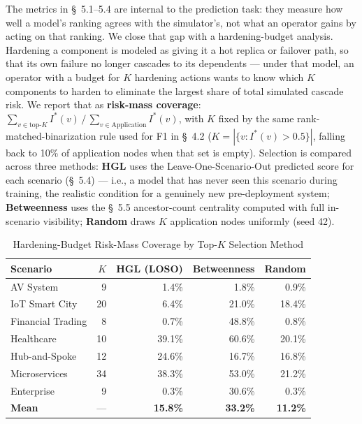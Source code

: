 \documentclass[review]{elsarticle}
\begin{document}
The metrics in \S~5.1--5.4 are internal to the prediction task: they measure how well a model's
ranking agrees with the simulator's, not what an operator gains by acting on that ranking. We close
that gap with a hardening-budget analysis. Hardening a component is modeled as giving it a hot
replica or failover path, so that its own failure no longer cascades to its dependents --- under
that model, an operator with a budget for $K$ hardening actions wants to know which $K$ components
to harden to eliminate the largest share of total simulated cascade risk. We report that as
\textbf{risk-mass coverage}: $\sum_{v \in \text{top-}K} I^*(v) \,/\, \sum_{v \in \text{Application}}
I^*(v)$, with $K$ fixed by the same rank-matched-binarization rule used for F1 in \S~4.2 ($K =
|\{v : I^*(v) > 0.5\}|$, falling back to 10\% of application nodes when that set is empty).
Selection is compared across three methods: \textbf{HGL} uses the Leave-One-Scenario-Out predicted
score for each scenario (\S~5.4) --- i.e., a model that has never seen this scenario during
training, the realistic condition for a genuinely new pre-deployment system; \textbf{Betweenness}
uses the \S~5.5 ancestor-count centrality computed with full in-scenario visibility;
\textbf{Random} draws $K$ application nodes uniformly (seed 42).

\begin{table}[htbp]
\centering
\caption{Hardening-Budget Risk-Mass Coverage by Top-$K$ Selection Method}
\label{tab:hardening}
\begin{tabular}{@{}lrrrr@{}}
\toprule
Scenario & $K$ & HGL (LOSO) & Betweenness & Random \\
\midrule
AV System & 9 & 1.4\% & 1.8\% & 0.9\% \\
IoT Smart City & 20 & 6.4\% & 21.0\% & 18.4\% \\
Financial Trading & 8 & 0.7\% & 48.8\% & 0.8\% \\
Healthcare & 10 & 39.1\% & 60.6\% & 20.1\% \\
Hub-and-Spoke & 12 & 24.6\% & 16.7\% & 16.8\% \\
Microservices & 34 & 38.3\% & 53.0\% & 21.2\% \\
Enterprise & 9 & 0.3\% & 30.6\% & 0.3\% \\
\midrule
\textbf{Mean} & --- & \textbf{15.8\%} & \textbf{33.2\%} & \textbf{11.2\%} \\
\bottomrule
\end{tabular}
\end{table}
\end{document}
